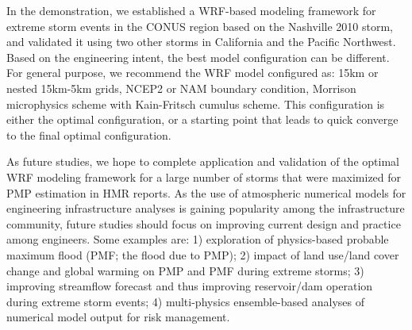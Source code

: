 In the demonstration, we established a WRF-based modeling framework for extreme storm events in the CONUS region based on the Nashville 2010 storm, and validated it using two other storms in California and the Pacific Northwest. Based on the engineering intent, the best model configuration can be different. For general purpose, we recommend the WRF model configured as: 15km or nested 15km-5km grids, NCEP2 or NAM boundary condition, Morrison microphysics scheme with Kain-Fritsch cumulus scheme. This configuration is either the optimal configuration, or a starting point that leads to quick converge to the final optimal configuration.

As future studies, we hope to complete application and validation of the optimal WRF modeling framework for a large number of storms that were maximized for PMP estimation in HMR reports. As the use of atmospheric numerical models for engineering infrastructure analyses is gaining popularity among the infrastructure community, future studies should focus on improving current design and practice among engineers. Some examples are: 1) exploration of physics-based probable maximum flood (PMF; the flood due to PMP); 2) impact of land use/land cover change and global warming on PMP and PMF during extreme storms; 3) improving streamflow forecast and thus improving reservoir/dam operation during extreme storm events; 4) multi-physics ensemble-based analyses of numerical model output for risk management.


